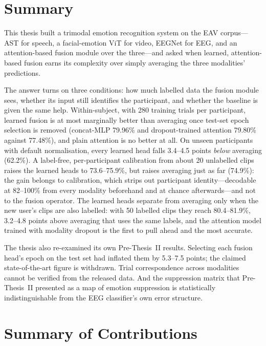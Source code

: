 \section{Summary}
This thesis built a trimodal emotion recognition system on the EAV corpus---AST for speech, a facial-emotion ViT for video, EEGNet for EEG, and an attention-based fusion module over the three---and asked when learned, attention-based fusion earns its complexity over simply averaging the three modalities' predictions.

The answer turns on three conditions: how much labelled data the fusion module sees, whether its input still identifies the participant, and whether the baseline is given the same help. Within-subject, with 280 training trials per participant, learned fusion is at most marginally better than averaging once test-set epoch selection is removed (concat-MLP 79.96\% and dropout-trained attention 79.80\% against 77.48\%), and plain attention is no better at all. On unseen participants with default normalisation, every learned head falls 3.4--4.5 points \emph{below} averaging (62.2\%). A label-free, per-participant calibration from about 20 unlabelled clips raises the learned heads to 73.6--75.9\%, but raises averaging just as far (74.9\%): the gain belongs to calibration, which strips out participant identity---decodable at 82--100\% from every modality beforehand and at chance afterwards---and not to the fusion operator. The learned heads separate from averaging only when the new user's clips are also labelled: with 50 labelled clips they reach 80.4--81.9\%, 3.2--4.8 points above averaging that uses the same labels, and the attention model trained with modality dropout is the first to pull ahead and the most accurate.

The thesis also re-examined its own Pre-Thesis~II results. Selecting each fusion head's epoch on the test set had inflated them by 5.3--7.5 points; the claimed state-of-the-art figure is withdrawn. Trial correspondence across modalities cannot be verified from the released data. And the suppression matrix that Pre-Thesis~II presented as a map of emotion suppression is statistically indistinguishable from the EEG classifier's own error structure.

\section{Summary of Contributions}

